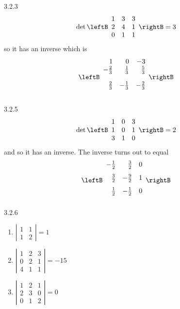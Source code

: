 \begin{Answer}{3.2.3}
\[
\det \leftB
\begin{array}{ccc}
1 & 3 & 3 \\
2 & 4 & 1 \\
0 & 1 & 1
\end{array}
\rightB = 3
\]
so it has an inverse which is
\[
\leftB
\begin{array}{rrr}
1 & 0 & -3 \\
-\vspace{0.05in}\frac{2}{3} & \vspace{0.05in}\frac{1}{3} & \vspace{0.05in}\frac{5}{3} \\
\vspace{0.05in}\frac{2}{3} & -\vspace{0.05in}\frac{1}{3} & -\vspace{0.05in}\frac{2}{3}
\end{array}
\rightB
\]
\end{Answer}
\begin{Answer}{3.2.5}
\[
\det \leftB
\begin{array}{rrr}
1 & 0 & 3 \\
1 & 0 & 1 \\
3 & 1 & 0
\end{array}
\rightB = 2
\]
and so it has an inverse. The inverse turns out to equal
\[
\leftB
\begin{array}{rrr}
-\vspace{0.05in}\frac{1}{2} & \vspace{0.05in}\frac{3}{2} & 0 \\
\vspace{0.05in}\frac{3}{2} & -\vspace{0.05in}\frac{9}{2} & 1 \\
\vspace{0.05in}\frac{1}{2} & -\vspace{0.05in}\frac{1}{2} & 0
\end{array}
\rightB
\]
\end{Answer}
\begin{Answer}{3.2.6}
\begin{enumerate}
\item $\left\vert
\begin{array}{cc}
1 & 1 \\
1 & 2
\end{array}
\right\vert = 1$
\item $\left\vert
\begin{array}{ccc}
1 & 2 & 3 \\
0 & 2 & 1 \\
4 & 1 & 1%
\end{array}
\right\vert = -15$
\item $\left\vert
\begin{array}{ccc}
1 & 2 & 1 \\
2 & 3 & 0 \\
0 & 1 & 2
\end{array}
\right\vert = 0$
\end{enumerate}
\end{Answer}
